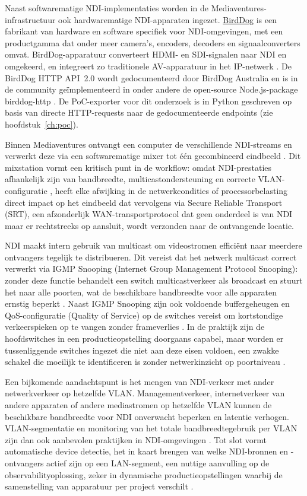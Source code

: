 Naast softwarematige NDI-implementaties worden in de Mediaventures-infrastructuur ook hardwarematige NDI-apparaten ingezet. \href{https://www.birddog.tv/}{BirdDog} is een fabrikant van hardware en software specifiek voor NDI-omgevingen, met een productgamma dat onder meer camera's, encoders, decoders en signaalconverters omvat. BirdDog-apparatuur converteert HDMI- en SDI-signalen naar NDI en omgekeerd, en integreert zo traditionele AV-apparatuur in het IP-netwerk \autocite{VanRenterghem2025}. De BirdDog HTTP API~2.0 wordt gedocumenteerd door BirdDog Australia \autocite{BirdDogAPI2024} en is in de community geïmplementeerd in onder andere de open-source Node.js-package birddog-http \autocite{CommLink2023}. De PoC-exporter voor dit onderzoek is in Python geschreven op basis van directe HTTP-requests naar de gedocumenteerde endpoints (zie hoofdstuk~\ref{ch:poc}).

Binnen Mediaventures ontvangt een computer de verschillende NDI-streams en verwerkt deze via een softwarematige mixer tot één gecombineerd eindbeeld \autocite{VanRenterghem2025}. Dit mixstation vormt een kritisch punt in de workflow: omdat NDI-prestaties afhankelijk zijn van bandbreedte, multicastondersteuning en correcte VLAN-configuratie \autocite{NewTek2022}, heeft elke afwijking in de netwerkcondities of processorbelasting direct impact op het eindbeeld dat vervolgens via Secure Reliable Transport (SRT), een afzonderlijk WAN-transportprotocol dat geen onderdeel is van NDI maar er rechtstreeks op aansluit, wordt verzonden naar de ontvangende locatie.

NDI maakt intern gebruik van multicast om videostromen efficiënt naar meerdere ontvangers tegelijk te distribueren. Dit vereist dat het netwerk multicast correct verwerkt via IGMP Snooping (Internet Group Management Protocol Snooping): zonder deze functie behandelt een switch multicastverkeer als broadcast en stuurt het naar alle poorten, wat de beschikbare bandbreedte voor alle apparaten ernstig beperkt \autocite{NewTek2022}. Naast IGMP Snooping zijn ook voldoende buffergeheugen en QoS-configuratie (Quality of Service) op de switches vereist om kortstondige verkeerspieken op te vangen zonder frameverlies \autocite{VizrtNDI2024}. In de praktijk zijn de hoofdswitches in een productieopstelling doorgaans capabel, maar worden er tussenliggende switches ingezet die niet aan deze eisen voldoen, een zwakke schakel die moeilijk te identificeren is zonder netwerkinzicht op poortniveau \autocite{VanRenterghem2025}.

Een bijkomende aandachtspunt is het mengen van NDI-verkeer met ander netwerkverkeer op hetzelfde VLAN. Managementverkeer, internetverkeer van andere apparaten of andere mediastromen op hetzelfde VLAN kunnen de beschikbare bandbreedte voor NDI onverwacht beperken en latentie verhogen. VLAN-segmentatie en monitoring van het totale bandbreedtegebruik per VLAN zijn dan ook aanbevolen praktijken in NDI-omgevingen \autocite{NewTek2022}. Tot slot vormt automatische device detectie, het in kaart brengen van welke NDI-bronnen en -ontvangers actief zijn op een LAN-segment, een nuttige aanvulling op de observabilityoplossing, zeker in dynamische productieopstellingen waarbij de samenstelling van apparatuur per project verschilt \autocite{NDIWhitePaper2023}.

